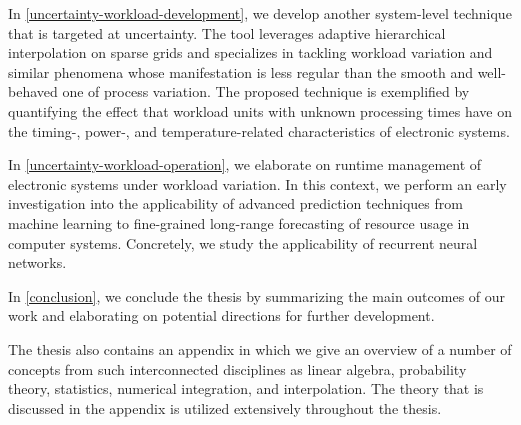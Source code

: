 In \cref{uncertainty-workload-development}, we develop another system-level
technique that is targeted at uncertainty. The tool leverages adaptive
hierarchical interpolation on sparse grids and specializes in tackling workload
variation and similar phenomena whose manifestation is less regular than the
smooth and well-behaved one of process variation. The proposed technique is
exemplified by quantifying the effect that workload units with unknown
processing times have on the timing-, power-, and temperature-related
characteristics of electronic systems.

In \cref{uncertainty-workload-operation}, we elaborate on runtime management of
electronic systems under workload variation. In this context, we perform an
early investigation into the applicability of advanced prediction techniques
from machine learning to fine-grained long-range forecasting of resource usage
in computer systems. Concretely, we study the applicability of recurrent neural
networks.

In \cref{conclusion}, we conclude the thesis by summarizing the main outcomes of
our work and elaborating on potential directions for further development.

The thesis also contains an appendix in which we give an overview of a number of
concepts from such interconnected disciplines as linear algebra, probability
theory, statistics, numerical integration, and interpolation. The theory that is
discussed in the appendix is utilized extensively throughout the thesis.
